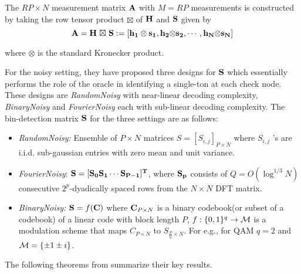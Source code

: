 The  $RP \times N $ measurement matrix $\bf A$ with $M = RP$ measurements is constructed by taking the row tensor product $ \boxtimes$ of $\bf H$ and $\bf S$ given by
\[
 \bf A = H \ { \boxtimes} \ S := [h_1 \otimes s_1, h_2 { \otimes} s_2, \cdots , h_N { \otimes} s_N]
 \]

where $\otimes$ is the standard Kronecker product.

For the noisy setting, they have proposed three designs for $\bf S$ which essentially performs the role of the oracle in identifying a single-ton at each check node. These designs are \emph{RandomNoisy} with near-linear decoding complexity, \emph{BinaryNoisy} and \emph{FourierNoisy} each with sub-linear decoding complexity.
The bin-detection matrix $\bf S$ for the three settings are as follows:
\begin{itemize}
\item \emph{RandomNoisy:}  Ensemble of $P \times N$ matrices $S = [S_{i,j}]_{P \times N}$ where $S_{i,j}$ $’$s are i.i.d. sub-gaussian entries with zero mean and unit variance.

\item  \emph{FourierNoisy}:  $\bf S = [S_0 S_1 \cdots S_{P-1}]^{T}$, where $\bf S_p$ consists of $Q=O(\log^{1/3}N)$ consecutive $2^p$-dyadically spaced rows from the $N \times N$ DFT matrix.

\item \emph{BinaryNoisy:}  $\mathbf{S} = f(\mathbf{C})$ where $\mathbf{C}_{P \times N}$ is a binary codebook(or subset of a codebook) of a linear code with block length $P$, $f:\{0,1\}^q\rightarrow \mathcal{M}$ is a modulation scheme that maps $C_{P \times N}$ to $S_{\frac{P}{q}\times N}$. For e.g., for QAM $q=2$ and $\mathcal{M}=\{\pm 1 \pm i\}$.
\end{itemize}

The following theorems from \cite{li2015subdraft} summarize their key results.

